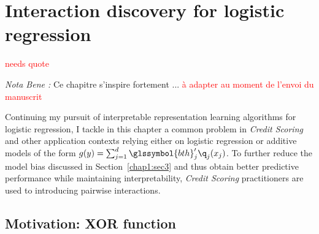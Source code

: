 \chapter{Interaction discovery for logistic regression} \label{chap5}

\minitoc


\textcolor{red}{needs quote}

\textit{Nota Bene :} Ce chapitre s'inspire fortement ... \textcolor{red}{à adapter au moment de l'envoi du manuscrit}


Continuing my pursuit of interpretable representation learning algorithms for logistic regression, I tackle in this chapter a common problem in \textit{Credit Scoring} and other application contexts relying either on logistic regression or additive models of the form $g(y) = \sum_{j=1}^d \glssymbol{bth}_j' \q_j(x_j)$. To further reduce the model bias discussed in Section~\ref{chap1:sec3} and thus obtain better predictive performance while maintaining interpretability, \textit{Credit Scoring} practitioners are used to introducing pairwise interactions.


\section{Motivation: XOR function}

